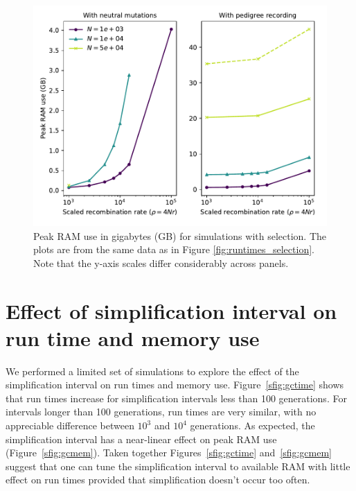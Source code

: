 \documentclass{article}
\begin{document}
\begin{figure}
    \includegraphics[]{sims/memuse}
    \caption{\label{sfig:ramsel}Peak RAM use in gigabytes (GB) for simulations with selection.  The plots are from the
        same data as in Figure \ref{fig:runtimes_selection}. Note that the y-axis scales differ considerably across
    panels.}
\end{figure}

\newpage

\section{Effect of simplification interval on run time and memory use}
\label{ss:gcinterval}
\renewcommand{\thefigure}{C\arabic{figure}}

We performed a limited set of simulations to explore the effect of the simplification interval on run times and memory
use. Figure~\ref{sfig:gctime} shows that run times increase for simplification intervals less than 100 generations.
For intervals longer than 100 generations, run times are very similar, with no appreciable difference between $10^3$ and $10^4$
generations.  As expected, the simplification interval has a near-linear effect on peak RAM use
(Figure~\ref{sfig:gcmem}).  Taken together Figures~\ref{sfig:gctime} and~\ref{sfig:gcmem} suggest that one can tune the
simplification interval to available RAM with little effect on run times provided that simplification doesn't occur too
often.
\end{document}
